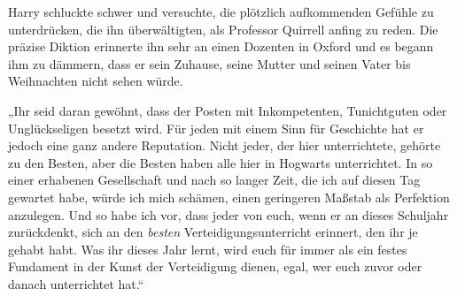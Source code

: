 Harry schluckte schwer und versuchte, die plötzlich aufkommenden Gefühle zu unterdrücken, die ihn überwältigten, als Professor Quirrell anfing zu reden. Die präzise Diktion erinnerte ihn sehr an einen Dozenten in Oxford und es begann ihm zu dämmern, dass er sein Zuhause, seine Mutter und seinen Vater bis Weihnachten nicht sehen würde.

„Ihr seid daran gewöhnt, dass der Posten mit Inkompetenten, Tunichtguten oder Unglückseligen besetzt wird. Für jeden mit einem Sinn für Geschichte hat er jedoch eine ganz andere Reputation. Nicht jeder, der hier unterrichtete, gehörte zu den Besten, aber die Besten haben alle hier in Hogwarts unterrichtet. In so einer erhabenen Gesellschaft und nach so langer Zeit, die ich auf diesen Tag gewartet habe, würde ich mich schämen, einen geringeren Maßstab als Perfektion anzulegen. Und so habe ich vor, dass jeder von euch, wenn er an dieses Schuljahr zurückdenkt, sich an den \emph{besten} Verteidigungsunterricht erinnert, den ihr je gehabt habt. Was ihr dieses Jahr lernt, wird euch für immer als ein festes Fundament in der Kunst der Verteidigung dienen, egal, wer euch zuvor oder danach unterrichtet hat.“

